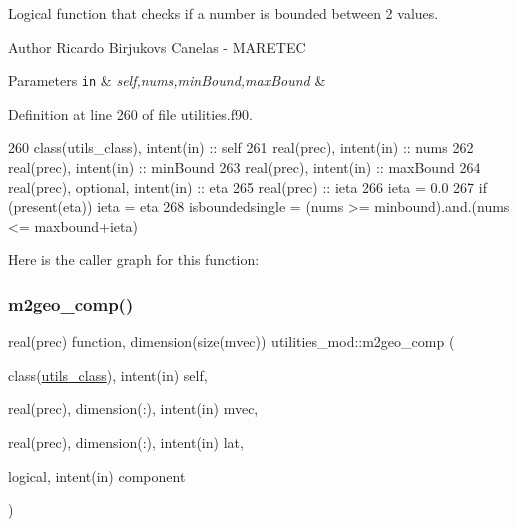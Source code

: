 Logical function that checks if a number is bounded between 2 values. 

\begin{DoxyAuthor}{Author}
Ricardo Birjukovs Canelas -\/ M\+A\+R\+E\+T\+EC 
\end{DoxyAuthor}

\begin{DoxyParams}[1]{Parameters}
\mbox{\tt in}  & {\em self,nums,min\+Bound,max\+Bound} & \\
\hline
\end{DoxyParams}


Definition at line 260 of file utilities.\+f90.


\begin{DoxyCode}
260     \textcolor{keywordtype}{class}(utils\_class), \textcolor{keywordtype}{intent(in)} :: self
261     \textcolor{keywordtype}{real(prec)}, \textcolor{keywordtype}{intent(in)} :: nums
262     \textcolor{keywordtype}{real(prec)}, \textcolor{keywordtype}{intent(in)} :: minBound
263     \textcolor{keywordtype}{real(prec)}, \textcolor{keywordtype}{intent(in)} :: maxBound
264     \textcolor{keywordtype}{real(prec)}, \textcolor{keywordtype}{optional}, \textcolor{keywordtype}{intent(in)} :: eta
265     \textcolor{keywordtype}{real(prec)} :: ieta
266     ieta = 0.0
267     \textcolor{keywordflow}{if} (\textcolor{keyword}{present}(eta)) ieta = eta
268     isboundedsingle = (nums >= minbound).and.(nums <= maxbound+ieta)
\end{DoxyCode}
Here is the caller graph for this function\+:
\mbox{\label{namespaceutilities__mod_ae6b8a45b229e3f1f8c2b12dd74e7a2dd}} 
\subsubsection{\texorpdfstring{m2geo\+\_\+comp()}{m2geo\_comp()}}
{\footnotesize\ttfamily real(prec) function, dimension(size(mvec)) utilities\+\_\+mod\+::m2geo\+\_\+comp (\begin{DoxyParamCaption}\item[{class(\mbox{\hyperlink{structutilities__mod_1_1utils__class}{utils\+\_\+class}}), intent(in)}]{self,  }\item[{real(prec), dimension(\+:), intent(in)}]{mvec,  }\item[{real(prec), dimension(\+:), intent(in)}]{lat,  }\item[{logical, intent(in)}]{component }\end{DoxyParamCaption})\hspace{0.3cm}{\ttfamily [private]}}



